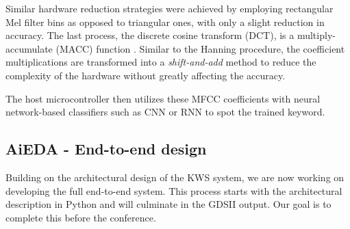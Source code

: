 Similar hardware reduction strategies were achieved by employing rectangular Mel filter bins as opposed to triangular ones, with only a slight reduction in accuracy. The last process, the discrete cosine transform (DCT), is a multiply-accumulate (MACC) function \cite{chong20220}. Similar to the Hanning procedure, the coefficient multiplications are transformed into a \textit{shift-and-add} method to reduce the complexity of the hardware without greatly affecting the accuracy.

 The host microcontroller then utilizes these MFCC coefficients with neural network-based classifiers such as CNN or RNN to spot the trained keyword.

\subsection{AiEDA - End-to-end design}
Building on the architectural design of the KWS system, we are now working on developing the full end-to-end system. This process starts with the architectural description in Python and will culminate in the GDSII output. Our goal is to complete this before the conference.